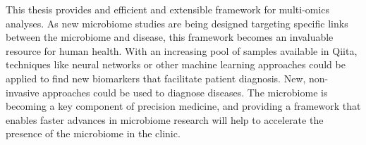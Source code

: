 This thesis provides and efficient and extensible framework for multi-omics analyses.
As new microbiome studies are being designed targeting specific links between the
microbiome and disease, this framework becomes an invaluable resource for human
health. With an increasing pool of samples available in Qiita, techniques like
neural networks or other machine learning approaches could be applied to find new
biomarkers that facilitate patient diagnosis. New, non-invasive approaches could
be used to diagnose diseases. The microbiome is becoming a key component of precision
medicine, and providing a framework that enables faster advances in microbiome
research will help to accelerate the presence of the microbiome in the clinic.
